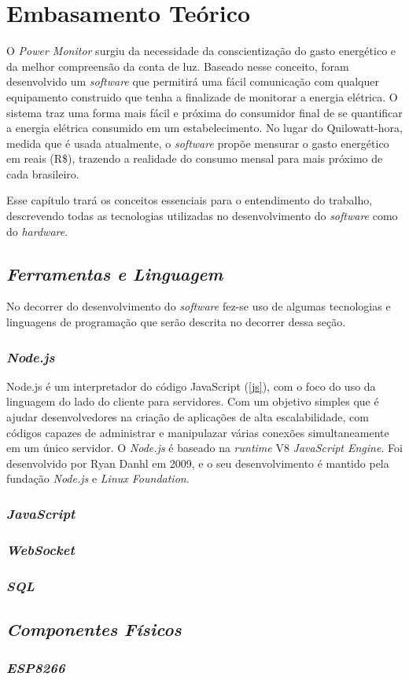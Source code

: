 \chapter[Embasamento Teórico]{Embasamento Teórico}
\label{ch:cap2}
O \textit{Power Monitor} surgiu da necessidade da conscientização do gasto energético e da melhor compreensão da conta de luz. Baseado nesse conceito,
foram desenvolvido um \textit{software} que permitirá uma fácil comunicação com qualquer equipamento construido que tenha a finalizade de monitorar a energia elétrica.
O sistema traz uma forma mais fácil e próxima do consumidor final de se quantificar a energia elétrica consumido em um estabelecimento. No lugar do Quilowatt-hora, medida que é usada atualmente,
o \textit{software} propõe mensurar o gasto energético em reais (R\$), trazendo a realidade do consumo mensal para mais próximo de cada brasileiro.

Esse capítulo trará os conceitos essenciais para o entendimento do trabalho, descrevendo todas as tecnologias utilizadas no desenvolvimento 
do \textit{software} como do \textit{hardware}.

\section[\textit{Ferramentas e Linguagem}]{\textit{Ferramentas e Linguagem}}\label{ferramenta-linguagem}
No decorrer do desenvolvimento do \textit{software} fez-se uso de algumas tecnologias e linguagens de programação que serão descrita no decorrer
dessa seção.
\subsection[\textit{Node.js}]{\textit{Node.js}}\label{node}
Node.js é um interpretador do código JavaScript (\autoref{js}), com o foco do uso da linguagem do lado do cliente para servidores. Com um objetivo simples
que é ajudar desenvolvedores na criação de aplicações de alta escalabilidade, com códigos capazes de administrar e manipulazar várias conexões simultaneamente
em um único servidor. O \textit{Node.js} é baseado na \textit{runtime} V8 \textit{JavaScript Engine}. Foi desenvolvido por Ryan Danhl em 2009, e o seu desenvolvimento
é mantido pela fundação \textit{Node.js} e \textit{Linux Foundation}. 
\subsection[\textit{JavaScript}]{\textit{JavaScript}}\label{js}
\subsection[\textit{WebSocket}]{\textit{WebSocket}}\label{websocket}
\subsection[\textit{SQL}]{\textit{SQL}}\label{sql}

\section[\textit{Componentes Físicos}]{\textit{Componentes Físicos}}\label{comp-fisico}
\subsection[\textit{ESP8266}]{\textit{ESP8266}}\label{esp}

